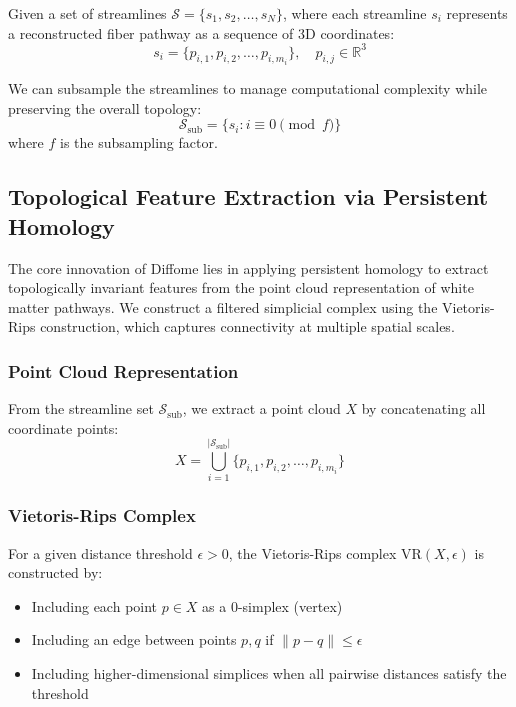 \documentclass[12pt,a4paper]{article}
\begin{document}
Given a set of streamlines $\mathcal{S} = \{s_1, s_2, \ldots, s_N\}$, where each streamline $s_i$ represents a reconstructed fiber pathway as a sequence of 3D coordinates:
\begin{equation}
s_i = \{p_{i,1}, p_{i,2}, \ldots, p_{i,m_i}\}, \quad p_{i,j} \in \mathbb{R}^3
\end{equation}

We can subsample the streamlines to manage computational complexity while preserving the overall topology:
\begin{equation}
\mathcal{S}_{\text{sub}} = \{s_i : i \equiv 0 \pmod{f}\}
\end{equation}
where $f$ is the subsampling factor.

\subsection{Topological Feature Extraction via Persistent Homology}

The core innovation of Diffome lies in applying persistent homology to extract topologically invariant features from the point cloud representation of white matter pathways. We construct a filtered simplicial complex using the Vietoris-Rips construction, which captures connectivity at multiple spatial scales.

\subsubsection{Point Cloud Representation}

From the streamline set $\mathcal{S}_{\text{sub}}$, we extract a point cloud $X$ by concatenating all coordinate points:
\begin{equation}
X = \bigcup_{i=1}^{|\mathcal{S}_{\text{sub}}|} \{p_{i,1}, p_{i,2}, \ldots, p_{i,m_i}\}
\end{equation}

\subsubsection{Vietoris-Rips Complex}

For a given distance threshold $\epsilon > 0$, the Vietoris-Rips complex $\text{VR}(X, \epsilon)$ is constructed by:
\begin{itemize}
    \item Including each point $p \in X$ as a 0-simplex (vertex)
    \item Including an edge between points $p, q$ if $\|p - q\| \leq \epsilon$
    \item Including higher-dimensional simplices when all pairwise distances satisfy the threshold
\end{itemize}
\end{document}

